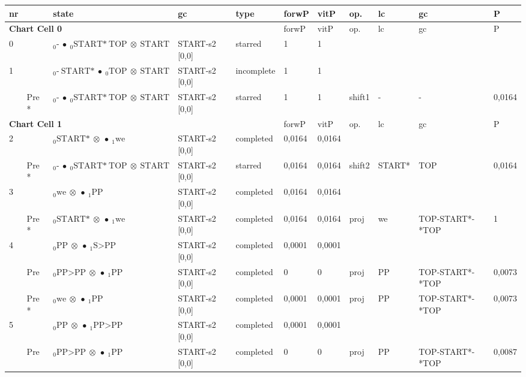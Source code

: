 \documentclass[10pt]{article}
\begin{document}
\begin{longtable}[htbp]{lllllllllll} \centering 
nr & & state & gc & type & forwP & vitP & op. & lc & gc & P \\ 
\hline \multicolumn{5}{l}{\textbf{Chart Cell 0}} & forwP & vitP & op. & lc & gc & P \\ \hline
0 & & $ {}_0 \textrm{-} \  \bullet \ {}_{0} \textrm{START*} \ \textrm{TOP} \  \otimes \ \textrm{START} $ & START-s2 [0,0] & starred & 1 & 1 & & & & \\ 
1 & & $ {}_0 \textrm{-} \ \textrm{START*} \  \bullet \ {}_{0} \textrm{TOP} \  \otimes \ \textrm{START} $ & START-s2 [0,0] & incomplete & 1 & 1 & & & & \\ 
 & Pre *& $ {}_0 \textrm{-} \  \bullet \ {}_{0} \textrm{START*} \ \textrm{TOP} \  \otimes \ \textrm{START} $ & START-s2 [0,0] & starred & 1 & 1 & shift1 & - & - & 0,0164 \\ 
\hline \multicolumn{5}{l}{\textbf{Chart Cell 1}} & forwP & vitP & op. & lc & gc & P \\ \hline
2 & & $ {}_0 \textrm{START*} \  \otimes \  \bullet \ {}_{1} \textrm{we} $ & START-s2 [0,0] & completed & 0,0164 & 0,0164 & & & & \\ 
 & Pre *& $ {}_0 \textrm{-} \  \bullet \ {}_{0} \textrm{START*} \ \textrm{TOP} \  \otimes \ \textrm{START} $ & START-s2 [0,0] & starred & 0,0164 & 0,0164 & shift2 & START* & TOP & 0,0164 \\ 
3 & & $ {}_0 \textrm{we} \  \otimes \  \bullet \ {}_{1} \textrm{PP} $ & START-s2 [0,0] & completed & 0,0164 & 0,0164 & & & & \\ 
 & Pre *& $ {}_0 \textrm{START*} \  \otimes \  \bullet \ {}_{1} \textrm{we} $ & START-s2 [0,0] & completed & 0,0164 & 0,0164 & proj & we & TOP-START*-*TOP & 1 \\ 
4 & & $ {}_0 \textrm{PP} \  \otimes \  \bullet \ {}_{1} \textrm{S>PP} $ & START-s2 [0,0] & completed & 0,0001 & 0,0001 & & & & \\ 
 & Pre & $ {}_0 \textrm{PP>PP} \  \otimes \  \bullet \ {}_{1} \textrm{PP} $ & START-s2 [0,0] & completed & 0 & 0 & proj & PP & TOP-START*-*TOP & 0,0073 \\ 
 & Pre *& $ {}_0 \textrm{we} \  \otimes \  \bullet \ {}_{1} \textrm{PP} $ & START-s2 [0,0] & completed & 0,0001 & 0,0001 & proj & PP & TOP-START*-*TOP & 0,0073 \\ 
5 & & $ {}_0 \textrm{PP} \  \otimes \  \bullet \ {}_{1} \textrm{PP>PP} $ & START-s2 [0,0] & completed & 0,0001 & 0,0001 & & & & \\ 
 & Pre & $ {}_0 \textrm{PP>PP} \  \otimes \  \bullet \ {}_{1} \textrm{PP} $ & START-s2 [0,0] & completed & 0 & 0 & proj & PP & TOP-START*-*TOP & 0,0087 \\ 

\end{longtable}
\end{document}
